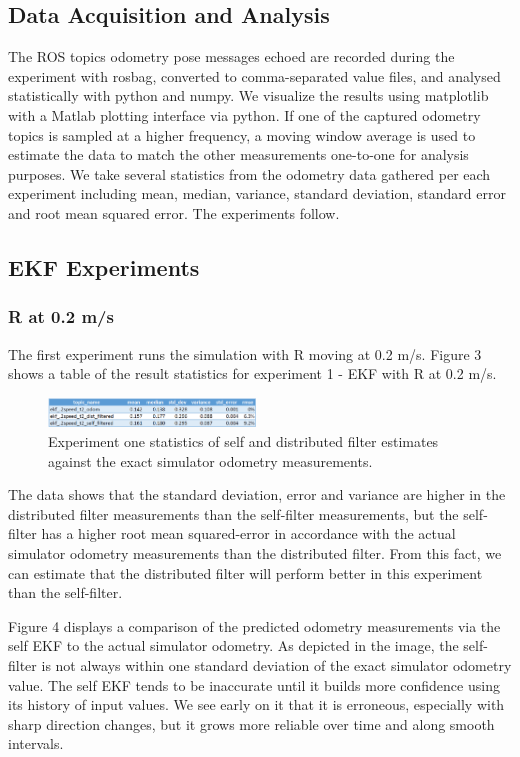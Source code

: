 \documentclass[conference]{IEEEtran} \usepackage[T1]{fontenc} \usepackage[backend=biber, style=ieee]{biblatex}
\begin{document}
\subsection{Data Acquisition and Analysis} \label{Data Acquisition and Analysis}
The ROS topics odometry pose messages echoed are 
recorded during the experiment with rosbag, converted to comma-separated value files, and analysed statistically with 
python and numpy. We visualize the results using matplotlib with a Matlab plotting interface via python. If one of the 
captured odometry topics is sampled at a higher frequency, a moving window average is used to estimate the data to match 
the other measurements one-to-one for analysis purposes. We take several statistics from the odometry data gathered per each experiment 
including mean, median, variance, standard deviation, standard error and root mean squared error. The 
experiments follow. 

\subsection{EKF Experiments} \label{EKF Experiments}
\subsubsection{R at 0.2 m/s} \label{EKF .2}
The first experiment runs the simulation with R moving at 0.2 m/s. Figure 3 shows a table of the result statistics for experiment 1 - EKF 
with R at 0.2 m/s. 

\begin{figure}[!ht]
\label{pic3} 
\centering 
\includegraphics[width=0.49\textwidth]{ekf_2_table}
\caption{Experiment one statistics of self and distributed filter estimates against the exact simulator odometry measurements.} 
\end{figure}

The data shows that the standard deviation, error and variance are higher in the distributed filter measurements than the 
self-filter measurements, but the self-filter has a higher root mean squared-error in accordance with the actual simulator odometry measurements than the distributed filter. From this fact, we can estimate that the distributed filter will perform better in this experiment than the self-filter. 

Figure 4 displays a comparison of the predicted odometry measurements via the self EKF to the actual simulator 
odometry. As depicted in the image, the self-filter is not always within one standard deviation of the exact simulator 
odometry value. The self EKF tends to be inaccurate until it builds more confidence using its history of input values. We see early on it that it
is erroneous, especially with sharp direction changes, but it grows more reliable over time and along smooth intervals.
\end{document}

